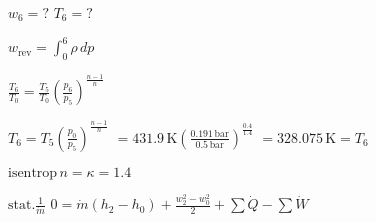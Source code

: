 \( w_6 = ? \)  
\( T_6 = ? \)  

\( w_{\text{rev}} = \int_{0}^{6} \rho \, dp \)  

\( \frac{T_6}{T_0} = \frac{T_5}{T_0} \left( \frac{p_6}{p_5} \right)^{\frac{n-1}{n}} \)  

\( T_6 = T_5 \left( \frac{p_0}{p_5} \right)^{\frac{n-1}{n}} \)  
\( = 431.9 \, \text{K} \left( \frac{0.191 \, \text{bar}}{0.5 \, \text{bar}} \right)^{\frac{0.4}{1.4}} \)  
\( = 328.075 \, \text{K} = T_6 \)  

\( \text{isentrop} \, n = \kappa = 1.4 \)  

\( \text{stat.} \frac{1}{\dot{m}} \)  
\( 0 = \dot{m} \left( h_2 - h_0 \right) + \frac{w_2^2 - w_0^2}{2} + \sum \dot{Q} - \sum \dot{W} \)